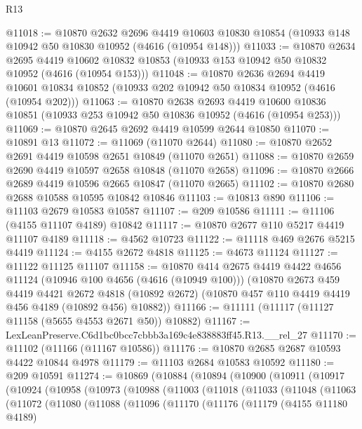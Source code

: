 \begin{lexlean}{R13}
\begin{coremodule}
@11018 := @10870
    @2632
    @2696
    @4419
    @10603
    @10830
    @10854
    (@10933 @148 @10942 @50 @10830 @10952 (@4616 (@10954 @148)))
@11033 := @10870
    @2634
    @2695
    @4419
    @10602
    @10832
    @10853
    (@10933 @153 @10942 @50 @10832 @10952 (@4616 (@10954 @153)))
@11048 := @10870
    @2636
    @2694
    @4419
    @10601
    @10834
    @10852
    (@10933 @202 @10942 @50 @10834 @10952 (@4616 (@10954 @202)))
@11063 := @10870
    @2638
    @2693
    @4419
    @10600
    @10836
    @10851
    (@10933 @253 @10942 @50 @10836 @10952 (@4616 (@10954 @253)))
@11069 := @10870 @2645 @2692 @4419 @10599 @2644 @10850
@11070 := @10891 @13
@11072 := @11069 (@11070 @2644)
@11080 := @10870 @2652 @2691 @4419 @10598 @2651 @10849 (@11070 @2651)
@11088 := @10870 @2659 @2690 @4419 @10597 @2658 @10848 (@11070 @2658)
@11096 := @10870 @2666 @2689 @4419 @10596 @2665 @10847 (@11070 @2665)
@11102 := @10870 @2680 @2688 @10588 @10595 @10842 @10846
@11103 := @10813 @890
@11106 := @11103 @2679 @10583 @10587
@11107 := @209 @10586
@11111 := @11106 (@4155 @11107 @4189) @10842
@11117 := @10870 @2677 @110 @5217 @4419 @11107 @4189
@11118 := @4562 @10723
@11122 := @11118 @469 @2676 @5215 @4419
@11124 := @4155 @2672 @4818
@11125 := @4673 @11124
@11127 := @11122 @11125 @11107
@11158 := @10870
    @414
    @2675
    @4419
    @4422
    @4656
    @11124
    (@10946 @100 @4656 (@4616 (@10949 @100)))
    (@10870
      @2673
      @459
      @4419
      @4421
      @2672
      @4818
      (@10892 @2672)
      (@10870 @457 @110 @4419 @4419 @456 @4189 (@10892 @456) @10882))
@11166 := @11111 (@11117 (@11127 @11158 (@5655 @4553 @2671 @50)) @10882)
@11167 := LexLeanPreserve.C6d1bc0bcc7cbbb3a169c4e838883ff45.R13.__rel_27
@11170 := @11102 (@11166 (@11167 @10586))
@11176 := @10870 @2685 @2687 @10593 @4422 @10844 @4978
@11179 := @11103 @2684 @10583 @10592
@11180 := @209 @10591
@11274 := @10869
    (@10884
      (@10894
        (@10900
          (@10911
            (@10917
              (@10924
                (@10958
                  (@10973
                    (@10988
                      (@11003
                        (@11018
                          (@11033
                            (@11048
                              (@11063
                                (@11072
                                  (@11080
                                    (@11088
                                      (@11096
                                        (@11170
                                          (@11176
                                            (@11179
                                              (@4155 @11180 @4189)

\end{coremodule}
\end{lexlean}

